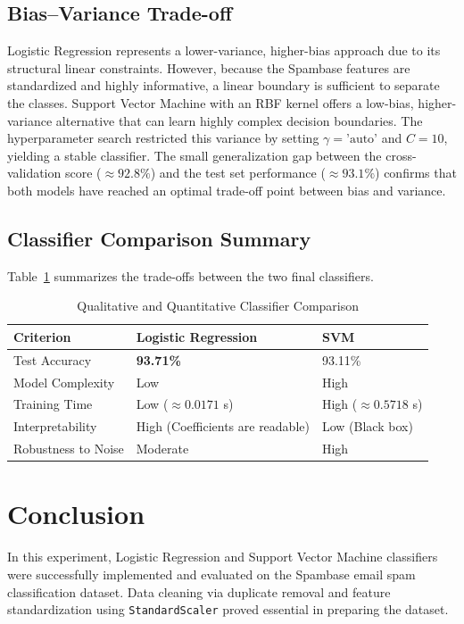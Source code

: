 \documentclass[12pt,a4paper]{article}
\begin{document}
\subsection{Bias--Variance Trade-off}
Logistic Regression represents a lower-variance, higher-bias approach due to its structural linear constraints. However, because the Spambase features are standardized and highly informative, a linear boundary is sufficient to separate the classes. Support Vector Machine with an RBF kernel offers a low-bias, higher-variance alternative that can learn highly complex decision boundaries. The hyperparameter search restricted this variance by setting $\gamma=\text{'auto'}$ and $C=10$, yielding a stable classifier. The small generalization gap between the cross-validation score ($\approx 92.8\%$) and the test set performance ($\approx 93.1\%$) confirms that both models have reached an optimal trade-off point between bias and variance.

\subsection{Classifier Comparison Summary}
Table~\ref{tab:qualitative_comp} summarizes the trade-offs between the two final classifiers.

\begin{table}[H]
\centering
\caption{Qualitative and Quantitative Classifier Comparison}
\label{tab:qualitative_comp}
\vspace{0.2cm}
\begin{tabular}{lll}
\toprule
\textbf{Criterion} & \textbf{Logistic Regression} & \textbf{SVM} \\
\midrule
Test Accuracy & \textbf{93.71\%} & 93.11\% \\
Model Complexity & Low & High \\
Training Time & Low ($\approx 0.0171$ s) & High ($\approx 0.5718$ s) \\
Interpretability & High (Coefficients are readable) & Low (Black box) \\
Robustness to Noise & Moderate & High \\
\bottomrule
\end{tabular}
\end{table}

\section{Conclusion}
In this experiment, Logistic Regression and Support Vector Machine classifiers were successfully implemented and evaluated on the Spambase email spam classification dataset. Data cleaning via duplicate removal and feature standardization using \texttt{StandardScaler} proved essential in preparing the dataset. 
\end{document}
